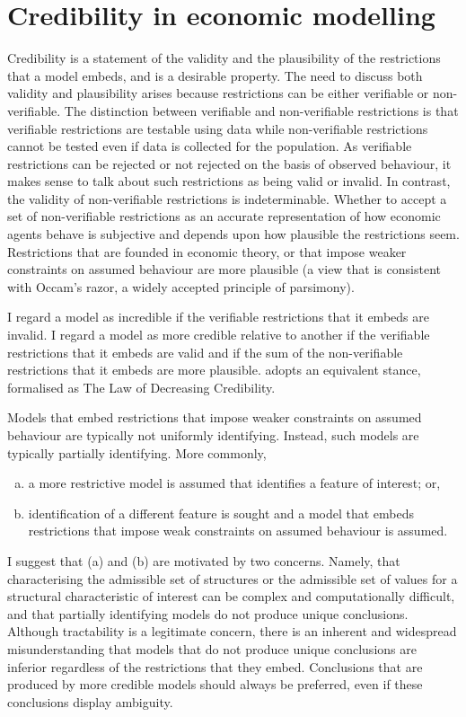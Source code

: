 \documentclass[10pt,a4paper,twoside]{article}
\numberwithin{equation}{section}
\begin{document}
\section{Credibility in economic modelling}
Credibility is a statement of the validity and the plausibility of the restrictions that a model embeds, and is a desirable property. The need to discuss both validity and plausibility arises because restrictions can be either verifiable or non-verifiable. The distinction between verifiable and non-verifiable restrictions is that verifiable restrictions are testable using data while non-verifiable restrictions cannot be tested even if data is collected for the population. As verifiable restrictions can be rejected or not rejected on the basis of observed behaviour, it makes sense to talk about such restrictions as being valid or invalid. In contrast, the validity of non-verifiable restrictions is indeterminable. Whether to accept a set of non-verifiable restrictions as an accurate representation of how economic agents behave is subjective and depends upon how plausible the restrictions seem. Restrictions that are founded in economic theory, or that impose weaker constraints on assumed behaviour are more plausible (a view that is consistent with Occam's razor, a widely accepted principle of parsimony).      

I regard a model as incredible if the verifiable restrictions that it embeds are invalid. I regard a model as more credible relative to another if the verifiable restrictions that it embeds are valid and if the sum of the non-verifiable restrictions that it embeds are more plausible. \cite{book.manski} adopts an equivalent stance, formalised as The Law of Decreasing Credibility. 

Models that embed restrictions that impose weaker constraints on assumed behaviour are typically not uniformly identifying. Instead, such models are typically partially identifying. More commonly, 
\begin{enumerate}[(a)]
\item a more restrictive model is assumed that identifies a feature of interest; or,
\item identification of a different feature is sought and a model that embeds restrictions that impose weak constraints on assumed behaviour is assumed.
\end{enumerate}
I suggest that (a) and (b) are motivated by two concerns. Namely, that characterising the admissible set of structures or the admissible set of values for a structural characteristic of interest can be complex and computationally difficult, and that partially identifying models do not produce unique conclusions. Although tractability is a legitimate concern, there is an inherent and widespread misunderstanding that models that do not produce unique conclusions are inferior regardless of the restrictions that they embed. Conclusions that are produced by more credible models should always be preferred, even if these conclusions display ambiguity. 
\end{document}

